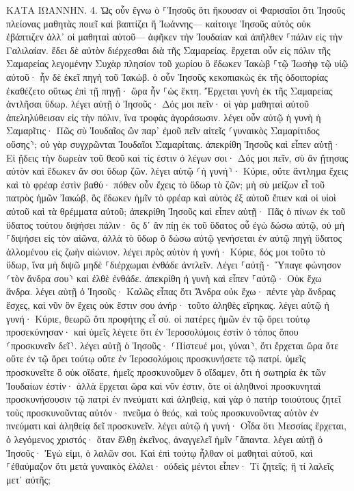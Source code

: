 \documentclass[twoside, 9pt]{extreport}
\begin{document}
ΚΑΤΑ ΙΩΑΝΝΗΝ.
4.
Ὡς οὖν ἔγνω ὁ ⸀Ἰησοῦς ὅτι ἤκουσαν οἱ Φαρισαῖοι ὅτι Ἰησοῦς πλείονας μαθητὰς ποιεῖ καὶ βαπτίζει ἢ Ἰωάννης— 
καίτοιγε Ἰησοῦς αὐτὸς οὐκ ἐβάπτιζεν ἀλλ᾽ οἱ μαθηταὶ αὐτοῦ— 
ἀφῆκεν τὴν Ἰουδαίαν καὶ ἀπῆλθεν ⸀πάλιν εἰς τὴν Γαλιλαίαν. 
ἔδει δὲ αὐτὸν διέρχεσθαι διὰ τῆς Σαμαρείας. 
ἔρχεται οὖν εἰς πόλιν τῆς Σαμαρείας λεγομένην Συχὰρ πλησίον τοῦ χωρίου ὃ ἔδωκεν Ἰακὼβ ⸀τῷ Ἰωσὴφ τῷ υἱῷ αὐτοῦ· 
ἦν δὲ ἐκεῖ πηγὴ τοῦ Ἰακώβ. ὁ οὖν Ἰησοῦς κεκοπιακὼς ἐκ τῆς ὁδοιπορίας ἐκαθέζετο οὕτως ἐπὶ τῇ πηγῇ· ὥρα ἦν ⸀ὡς ἕκτη. 
Ἔρχεται γυνὴ ἐκ τῆς Σαμαρείας ἀντλῆσαι ὕδωρ. λέγει αὐτῇ ὁ Ἰησοῦς· Δός μοι πεῖν· 
οἱ γὰρ μαθηταὶ αὐτοῦ ἀπεληλύθεισαν εἰς τὴν πόλιν, ἵνα τροφὰς ἀγοράσωσιν. 
λέγει οὖν αὐτῷ ἡ γυνὴ ἡ Σαμαρῖτις· Πῶς σὺ Ἰουδαῖος ὢν παρ᾽ ἐμοῦ πεῖν αἰτεῖς ⸂γυναικὸς Σαμαρίτιδος οὔσης⸃; οὐ γὰρ συγχρῶνται Ἰουδαῖοι Σαμαρίταις. 
ἀπεκρίθη Ἰησοῦς καὶ εἶπεν αὐτῇ· Εἰ ᾔδεις τὴν δωρεὰν τοῦ θεοῦ καὶ τίς ἐστιν ὁ λέγων σοι· Δός μοι πεῖν, σὺ ἂν ᾔτησας αὐτὸν καὶ ἔδωκεν ἄν σοι ὕδωρ ζῶν. 
λέγει αὐτῷ ⸂ἡ γυνή⸃· Κύριε, οὔτε ἄντλημα ἔχεις καὶ τὸ φρέαρ ἐστὶν βαθύ· πόθεν οὖν ἔχεις τὸ ὕδωρ τὸ ζῶν; 
μὴ σὺ μείζων εἶ τοῦ πατρὸς ἡμῶν Ἰακώβ, ὃς ἔδωκεν ἡμῖν τὸ φρέαρ καὶ αὐτὸς ἐξ αὐτοῦ ἔπιεν καὶ οἱ υἱοὶ αὐτοῦ καὶ τὰ θρέμματα αὐτοῦ; 
ἀπεκρίθη Ἰησοῦς καὶ εἶπεν αὐτῇ· Πᾶς ὁ πίνων ἐκ τοῦ ὕδατος τούτου διψήσει πάλιν· 
ὃς δ᾽ ἂν πίῃ ἐκ τοῦ ὕδατος οὗ ἐγὼ δώσω αὐτῷ, οὐ μὴ ⸀διψήσει εἰς τὸν αἰῶνα, ἀλλὰ τὸ ὕδωρ ὃ δώσω αὐτῷ γενήσεται ἐν αὐτῷ πηγὴ ὕδατος ἁλλομένου εἰς ζωὴν αἰώνιον. 
λέγει πρὸς αὐτὸν ἡ γυνή· Κύριε, δός μοι τοῦτο τὸ ὕδωρ, ἵνα μὴ διψῶ μηδὲ ⸀διέρχωμαι ἐνθάδε ἀντλεῖν. 
Λέγει ⸀αὐτῇ· Ὕπαγε φώνησον ⸂τὸν ἄνδρα σου⸃ καὶ ἐλθὲ ἐνθάδε. 
ἀπεκρίθη ἡ γυνὴ καὶ εἶπεν ⸀αὐτῷ· Οὐκ ἔχω ἄνδρα. λέγει αὐτῇ ὁ Ἰησοῦς· Καλῶς εἶπας ὅτι Ἄνδρα οὐκ ἔχω· 
πέντε γὰρ ἄνδρας ἔσχες, καὶ νῦν ὃν ἔχεις οὐκ ἔστιν σου ἀνήρ· τοῦτο ἀληθὲς εἴρηκας. 
λέγει αὐτῷ ἡ γυνή· Κύριε, θεωρῶ ὅτι προφήτης εἶ σύ. 
οἱ πατέρες ἡμῶν ἐν τῷ ὄρει τούτῳ προσεκύνησαν· καὶ ὑμεῖς λέγετε ὅτι ἐν Ἱεροσολύμοις ἐστὶν ὁ τόπος ὅπου ⸂προσκυνεῖν δεῖ⸃. 
λέγει αὐτῇ ὁ Ἰησοῦς· ⸂Πίστευέ μοι, γύναι⸃, ὅτι ἔρχεται ὥρα ὅτε οὔτε ἐν τῷ ὄρει τούτῳ οὔτε ἐν Ἱεροσολύμοις προσκυνήσετε τῷ πατρί. 
ὑμεῖς προσκυνεῖτε ὃ οὐκ οἴδατε, ἡμεῖς προσκυνοῦμεν ὃ οἴδαμεν, ὅτι ἡ σωτηρία ἐκ τῶν Ἰουδαίων ἐστίν· 
ἀλλὰ ἔρχεται ὥρα καὶ νῦν ἐστιν, ὅτε οἱ ἀληθινοὶ προσκυνηταὶ προσκυνήσουσιν τῷ πατρὶ ἐν πνεύματι καὶ ἀληθείᾳ, καὶ γὰρ ὁ πατὴρ τοιούτους ζητεῖ τοὺς προσκυνοῦντας αὐτόν· 
πνεῦμα ὁ θεός, καὶ τοὺς προσκυνοῦντας αὐτὸν ἐν πνεύματι καὶ ἀληθείᾳ δεῖ προσκυνεῖν. 
λέγει αὐτῷ ἡ γυνή· Οἶδα ὅτι Μεσσίας ἔρχεται, ὁ λεγόμενος χριστός· ὅταν ἔλθῃ ἐκεῖνος, ἀναγγελεῖ ἡμῖν ⸀ἅπαντα. 
λέγει αὐτῇ ὁ Ἰησοῦς· Ἐγώ εἰμι, ὁ λαλῶν σοι. 
Καὶ ἐπὶ τούτῳ ἦλθαν οἱ μαθηταὶ αὐτοῦ, καὶ ⸀ἐθαύμαζον ὅτι μετὰ γυναικὸς ἐλάλει· οὐδεὶς μέντοι εἶπεν· Τί ζητεῖς; ἢ τί λαλεῖς μετ᾽ αὐτῆς; 
\end{document}
